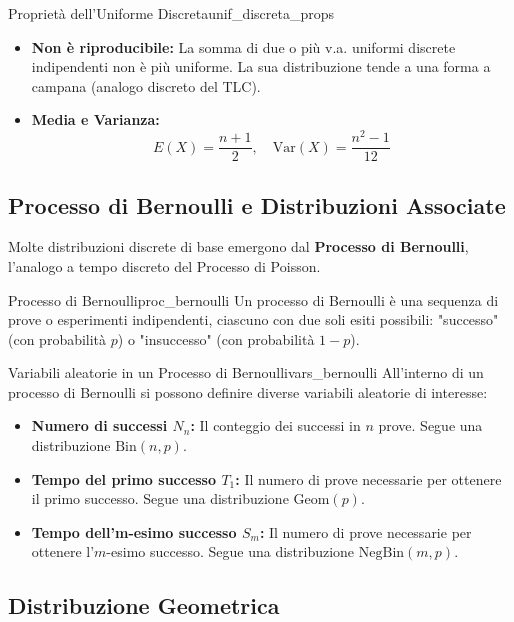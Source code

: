 \begin{proposizione}{Proprietà dell'Uniforme Discreta}{unif_discreta_props}
\begin{itemize}
    \item \textbf{Non è riproducibile:} La somma di due o più v.a. uniformi discrete indipendenti non è più uniforme. La sua distribuzione tende a una forma a campana (analogo discreto del TLC).
    \item \textbf{Media e Varianza:}
    \[ E(X) = \frac{n+1}{2}, \quad \text{Var}(X) = \frac{n^2-1}{12} \]
\end{itemize}
\end{proposizione}

\subsection{Processo di Bernoulli e Distribuzioni Associate}
Molte distribuzioni discrete di base emergono dal \textbf{Processo di Bernoulli}, l'analogo a tempo discreto del Processo di Poisson.

\begin{definizione}{Processo di Bernoulli}{proc_bernoulli}
Un processo di Bernoulli è una sequenza di prove o esperimenti indipendenti, ciascuno con due soli esiti possibili: "successo" (con probabilità \(p\)) o "insuccesso" (con probabilità \(1-p\)).
\end{definizione}

\begin{nota}{Variabili aleatorie in un Processo di Bernoulli}{vars_bernoulli}
All'interno di un processo di Bernoulli si possono definire diverse variabili aleatorie di interesse:
\begin{itemize}
    \item \textbf{Numero di successi \(N_n\):} Il conteggio dei successi in \(n\) prove. Segue una distribuzione \(\text{Bin}(n,p)\).
    \item \textbf{Tempo del primo successo \(T_1\):} Il numero di prove necessarie per ottenere il primo successo. Segue una distribuzione \(\text{Geom}(p)\).
    \item \textbf{Tempo dell'm-esimo successo \(S_m\):} Il numero di prove necessarie per ottenere l'\(m\)-esimo successo. Segue una distribuzione \(\text{NegBin}(m,p)\).
\end{itemize}
\end{nota}

\subsection{Distribuzione Geometrica}

